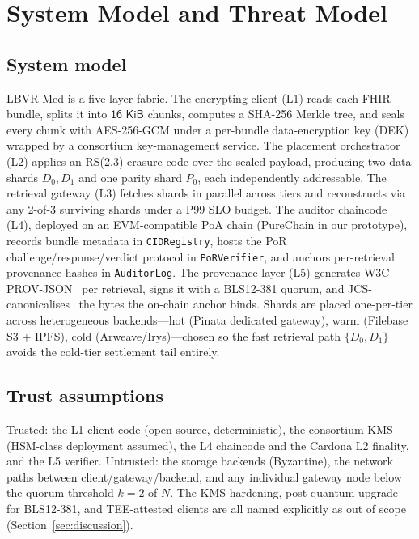 \section{System Model and Threat Model}
\label{sec:model}

\subsection{System model}
\label{sec:model:system}

LBVR-Med is a five-layer fabric. The encrypting client (L1) reads each FHIR bundle, splits it into \(\textsf{16~KiB}\) chunks, computes a SHA-256 Merkle tree, and seals every chunk with AES-256-GCM under a per-bundle data-encryption key (DEK) wrapped by a consortium key-management service. The placement orchestrator (L2) applies an RS(2,3) erasure code over the sealed payload, producing two data shards \(D_0, D_1\) and one parity shard \(P_0\), each independently addressable. The retrieval gateway (L3) fetches shards in parallel across tiers and reconstructs via any 2-of-3 surviving shards under a P99 SLO budget. The auditor chaincode (L4), deployed on an EVM-compatible PoA chain (PureChain in our prototype), records bundle metadata in \texttt{CIDRegistry}, hosts the PoR challenge/response/verdict protocol in \texttt{PoRVerifier}, and anchors per-retrieval provenance hashes in \texttt{AuditorLog}. The provenance layer (L5) generates W3C PROV-JSON~\cite{w3cprov} per retrieval, signs it with a BLS12-381 quorum, and JCS-canonicalises~\cite{rfc8785} the bytes the on-chain anchor binds. Shards are placed one-per-tier across heterogeneous backends---hot (Pinata dedicated gateway), warm (Filebase S3 + IPFS), cold (Arweave/Irys)---chosen so the fast retrieval path \(\{D_0, D_1\}\) avoids the cold-tier settlement tail entirely.

\subsection{Trust assumptions}
\label{sec:model:trust}

Trusted: the L1 client code (open-source, deterministic), the consortium KMS (HSM-class deployment assumed), the L4 chaincode and the Cardona L2 finality, and the L5 verifier. Untrusted: the storage backends (Byzantine), the network paths between client/gateway/backend, and any individual gateway node below the quorum threshold \(k=2\) of \(N\). The KMS hardening, post-quantum upgrade for BLS12-381, and TEE-attested clients are all named explicitly as out of scope (Section~\ref{sec:discussion}).

